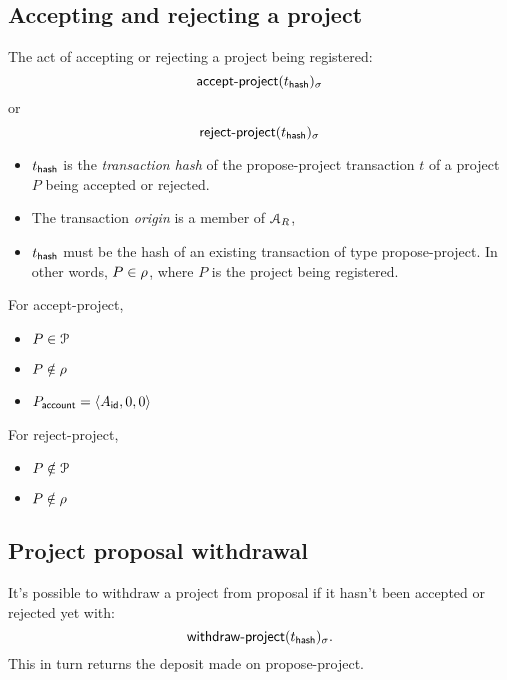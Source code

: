 \subsection{Accepting and rejecting a project}
\label{s:accepting-projects}
The act of accepting or rejecting a project being registered:
\[
    \operatorname{\mathsf{accept-project}}\lparen t_{\mathsf{hash}}\rparen_\sigma
\]
or
\[
    \operatorname{\mathsf{reject-project}}\lparen t_{\mathsf{hash}}\rparen_\sigma
\]

\begin{itemize}
    \item $t_{\mathsf{hash}}$ is the \emph{transaction hash} of the
        \textsf{propose-project} transaction $t$ of a project $P$
        being accepted or rejected.
\end{itemize}
\validation
\begin{itemize}
    \item The transaction \emph{origin} is a member of $\mathcal{A}_R$,
    \item $t_{\mathsf{hash}}$ must be the hash of an existing transaction of
        type \textsf{propose-project}. In other words, $P \in \mathcal{\rho}$,
        where $P$ is the project being registered.
\end{itemize}

\bigskip
\noindent For \textsf{accept-project},
\newline\outputs
\begin{itemize}
    \item $P \in \mathcal{P}$
    \item $P \notin \mathcal{\rho}$
    \item $P_{\mathsf{account}} = \langle A_{\mathsf{id}}, 0, 0\rangle$
\end{itemize}
\bigskip
\noindent For \textsf{reject-project},
\newline\outputs
\begin{itemize}
    \item $P \notin \mathcal{P}$
    \item $P \notin \mathcal{\rho}$
\end{itemize}

\subsection{Project proposal withdrawal}
It's possible to withdraw a project from proposal if it hasn't been
accepted or rejected yet with:
\[
    \operatorname{\mathsf{withdraw-project}}\lparen t_{\mathsf{hash}}\rparen_\sigma.
\]
This in turn returns the deposit made on \textsf{propose-project}.

